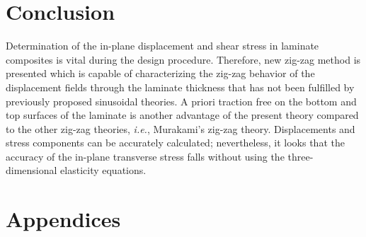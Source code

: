 \documentclass{article}
\begin{document}
\section{Conclusion}
Determination of the in-plane displacement and shear stress in laminate composites is vital during the design procedure. Therefore, new zig-zag method is presented which is capable of characterizing the zig-zag behavior of the displacement fields through the laminate thickness that has not been fulfilled by previously proposed sinusoidal theories. A priori traction free on the bottom and top surfaces of the laminate is another advantage of the present theory compared to the other zig-zag theories, \emph{i.e.}, Murakami's zig-zag theory. Displacements and stress components can be accurately calculated; nevertheless, it looks that the accuracy of the in-plane transverse stress falls without using the three-dimensional elasticity equations. 

\appendix
\section*{Appendices}



\newpage


\end{document}
